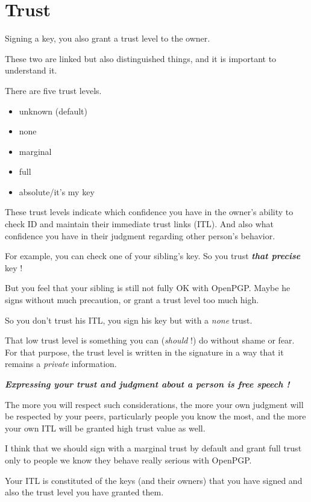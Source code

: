 \section{Trust}\label{trust}

Signing a key, you also grant a trust level to the owner.

These two are linked but also distinguished things, and it is important
to understand it.

There are five trust levels.

\begin{itemize}
\itemsep1pt\parskip0pt
\item
  unknown (default)
\item
  none
\item
  marginal
\item
  full
\item
  absolute/it's my key
\end{itemize}

These trust levels indicate which confidence you have in the owner's
ability to check ID and maintain their immediate trust links (ITL). And
also what confidence you have in their judgment regarding other person's
behavior.

For example, you can check one of your sibling's key. So you trust
\textbf{\emph{that precise}} key !

But you feel that your sibling is still not fully OK with OpenPGP. Maybe
he signs without much precaution, or grant a trust level too much high.

So you don't trust his ITL, you sign his key but with a \emph{none}
trust.

That low trust level is something you can (\emph{should} !) do without
shame or fear. For that purpose, the trust level is written in the
signature in a way that it remains a \emph{private} information.

\textbf{\emph{Expressing your trust and judgment about a person is free speech !}}

The more you will respect such considerations, the more your own
judgment will be respected by your peers, particularly people you know
the most, and the more your own ITL will be granted high trust value as
well.

I think that we should sign with a marginal trust by default and grant
full trust only to people we know they behave really serious with
OpenPGP.

Your ITL is constituted of the keys (and their owners) that you have
signed and also the trust level you have granted them.

